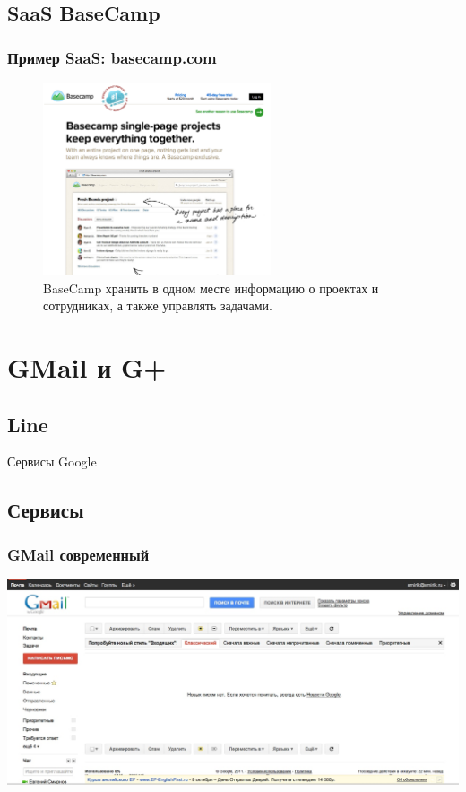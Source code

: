 \documentclass[compress,red]{beamer}
\begin{document}
\subsection{SaaS BaseCamp}
\begin{frame}
  \frametitle{Пример SaaS: basecamp.com}
	  \begin{figure}
	    \includegraphics[width=0.6\textwidth]{images/basecamp.png}
	    \caption{BaseCamp хранить в одном месте информацию о проектах и сотрудниках, а также управлять задачами.}
	  \end{figure}
\end{frame}

\section{GMail и G+}
\subsection{Line}
\begin{frame}
  \begin{center}
    \Huge{Сервисы Google}
  \end{center}
\end{frame}

\subsection{Сервисы}
\begin{frame}
  \frametitle{GMail современный}
	\centerline{\includegraphics[width=1.0\textwidth]{images/gmail-new.jpg}}
\end{frame}
\end{document}
